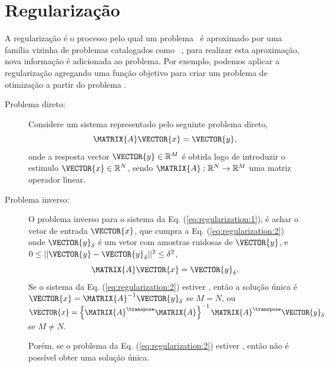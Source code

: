 

\section{Regularização}




A regularização é o processo pelo qual um problema \illposed~é 
aproximado por uma família vizinha de problemas catalogados como \wellposed~\cite[pp. 49]{engl2000regularization},
para realizar esta aproximação, nova informação  é adicionada ao problema.
Por exemplo, podemos aplicar a regularização agregando uma função objetivo para criar um problema de otimização
a partir do problema \illposed.

\begin{description}
\item[Problema direto:] Considere um sistema representado pelo seguinte problema direto,
\begin{equation}\label{eq:regularization:1}
\MATRIX{A}\VECTOR{x}=\VECTOR{y},
\end{equation}
onde a resposta vector $\VECTOR{y}\in \mathbb{R}^M$ é obtida logo de introduzir o estimulo $\VECTOR{x}\in \mathbb{R}^N$,
sendo $\MATRIX{A}:\mathbb{R}^N \rightarrow \mathbb{R}^M$ uma matriz operador linear.

\item[Problema inverso:] O problema inverso para o sistema da Eq. (\ref{eq:regularization:1}), é
achar o vetor de entrada $\VECTOR{x}$, que cumpra  a Eq. (\ref{eq:regularization:2})
onde $\VECTOR{y}_{\delta}$ é um vetor com amostras ruidosas de $\VECTOR{y}$,
e $0\leq||\VECTOR{y}-\VECTOR{y}_{\delta}||^2\leq \delta^2$,
\begin{equation}\label{eq:regularization:2}
\MATRIX{A}\VECTOR{x}=\VECTOR{y}_{\delta}.
\end{equation}
Se o sistema da Eq. (\ref{eq:regularization:2}) estiver \wellposed,
então a solução única é $\VECTOR{x}=\MATRIX{A}^{-1}\VECTOR{y}_{\delta}$ se $M=N$,
ou $\VECTOR{x}=\left\{\MATRIX{A}^{\transpose}\MATRIX{A}\right\}^{-1}\MATRIX{A}^{\transpose}\VECTOR{y}_{\delta}$ se $M\neq N$.

Porém, se o problema da Eq. (\ref{eq:regularization:2}) estiver \illposed,
então não é possível obter uma solução única.\\
\end{description}

